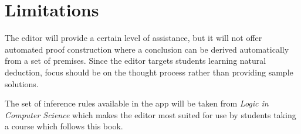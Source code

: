 \section{Limitations}

The editor will provide a certain level of assistance, but it will not offer automated proof construction where a conclusion can be derived automatically from a set of premises. Since the editor targets students learning natural deduction, focus should be on the thought process rather than providing sample solutions.

The set of inference rules available in the app will be taken from \textit{Logic in Computer Science} \cite{huth_ryan_2018} which makes the editor most suited for use by students taking a course which follows this book.